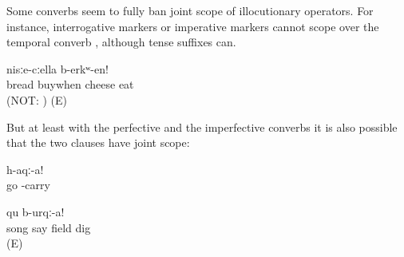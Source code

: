 Some converbs seem to fully ban joint scope of illocutionary operators. For instance, interrogative markers  or imperative markers  cannot scope over the temporal converb , although tense suffixes can. 
%
\begin{exe}
	\ex	\label{ex:‎When you buy bread, eat it with cheese!}
	\gll	[t'ult'	asː-ib=qːel]		nisːe-cːella	b-erkʷ-en!\\
		bread	buywhen	cheese	eat\\
	\glt	{} (NOT: ) (E)
\end{exe}

But at least with the perfective and the imperfective converbs it is also possible that the two clauses have joint scope:
%
\begin{exe}
	\ex	\label{ex:Go and bring it}
	\gll	[ag-ur-re]	h-aqː-a!\\
		go	-carry\\
	\glt	{}

	\ex	\label{ex:‎Sing a song and dig the field}
	\gll	[dalaj	Ø-ik'-ul]	qu	b-urqː-a!\\
		song	say	field	dig\\
	\glt	{} (E)
\end{exe}

